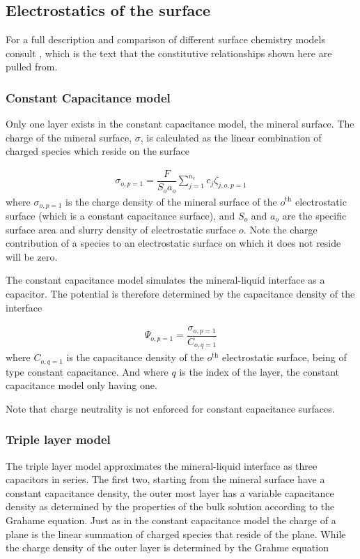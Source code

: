 \documentclass{article}
\begin{document}
\subsection{Electrostatics of the surface}

For a full description and comparison of different surface chemistry models consult \citet{westall1980}{}, which is the text that the constitutive relationships shown here are pulled from. 

\subsubsection{Constant Capacitance model}
Only one layer exists in the constant capacitance model, the mineral surface. The charge of the mineral surface, $\sigma$, is calculated as the linear combination of charged species which reside on the surface

\begin{align}
    \sigma_{o,p=1} = \dfrac{F}{S_o a_o}\sum_{j=1}^{n_c}c_j\zeta_{j,o,p=1}
\end{align}
where $\sigma_{o,p=1}$ is the charge density of the mineral surface of the $o^\text{th}$ electrostatic surface (which is a constant capacitance surface), and $S_o$ and $a_o$ are the specific surface area and slurry density of electrostatic surface $o$. Note the charge contribution of a species to an electrostatic surface on which it does not reside will be zero.

The constant capacitance model simulates the mineral-liquid interface as a capacitor. The potential is therefore determined by the capacitance density of the interface

\begin{align}
    \Psi_{o,p=1} = \dfrac{\sigma_{o,p=1}}{C_{o,q=1}}
\end{align}
where $C_{o,q=1}$ is the capacitance density of the $o^\text{th}$ electrostatic surface, being of type constant capacitance. And where $q$ is the index of the layer, the constant capacitance model only having one.  

Note that charge neutrality is not enforced for constant capacitance surfaces. 
\subsubsection{Triple layer model}

The triple layer model approximates the mineral-liquid interface as three capacitors in series. The first two, starting from the mineral surface have a constant capacitance density, the outer most layer has a variable capacitance density as determined by the properties of the bulk solution according to the Grahame equation. Just as in the constant capacitance model the charge of a plane is the linear summation of charged species that reside of the plane. While the charge density of the outer layer is determined by the Grahme equation
\end{document}
